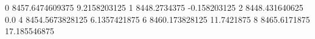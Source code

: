 0 8457.6474609375 9.2158203125
1 8448.2734375 -0.158203125
2 8448.431640625 0.0
4 8454.5673828125 6.1357421875
6 8460.173828125 11.7421875
8 8465.6171875 17.185546875
